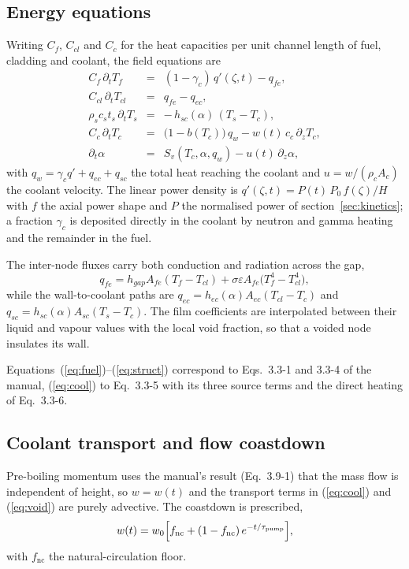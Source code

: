 \documentclass[11pt,a4paper]{article}
\begin{document}
\subsection{Energy equations}

Writing $C_f$, $C_{cl}$ and $C_c$ for the heat capacities per unit channel length of fuel,
cladding and coolant, the field equations are
\begin{eqnarray}
C_f\,\partial_t T_f &=& (1-\gamma_c)\,q'(\zeta,t) - q_{fe}, \label{eq:fuel}\\
C_{cl}\,\partial_t T_{cl} &=& q_{fe} - q_{ec}, \label{eq:clad}\\
\rho_s c_s t_s\,\partial_t T_s &=& -\,h_{sc}(\alpha)\,(T_s - T_c), \label{eq:struct}\\
C_c\,\partial_t T_c &=& \bigl(1 - b(T_c)\bigr)\,q_w - w(t)\,c_c\,\partial_z T_c,
  \label{eq:cool}\\
\partial_t \alpha &=& S_v(T_c,\alpha,q_w) - u(t)\,\partial_z \alpha, \label{eq:void}
\end{eqnarray}
with $q_w = \gamma_c q' + q_{ec} + q_{sc}$ the total heat reaching the coolant and
$u = w/(\rho_c A_c)$ the coolant velocity. The linear power density is
$q'(\zeta,t) = P(t)\,P_0\,f(\zeta)/H$ with $f$ the axial power shape and $P$ the normalised
power of section~\ref{sec:kinetics}; a fraction $\gamma_c$ is deposited directly in the
coolant by neutron and gamma heating and the remainder in the fuel.

The inter-node fluxes carry both conduction and radiation across the gap,
\begin{equation}
q_{fe} = h_{gap} A_{fe} (T_f - T_{cl})
       + \sigma \varepsilon A_{fe} \bigl(T_f^4 - T_{cl}^4\bigr),
\end{equation}
while the wall-to-coolant paths are
$q_{ec} = h_{ec}(\alpha) A_{ec} (T_{cl} - T_c)$ and
$q_{sc} = h_{sc}(\alpha) A_{sc} (T_s - T_c)$. The film coefficients are interpolated
between their liquid and vapour values with the local void fraction, so that a voided node
insulates its wall.

Equations~(\ref{eq:fuel})--(\ref{eq:struct}) correspond to Eqs.~3.3-1 and 3.3-4 of the
manual, (\ref{eq:cool}) to Eq.~3.3-5 with its three source terms and the direct heating of
Eq.~3.3-6.

\subsection{Coolant transport and flow coastdown}

Pre-boiling momentum uses the manual's result (Eq.~3.9-1) that the mass flow is independent
of height, so $w = w(t)$ and the transport terms in (\ref{eq:cool}) and (\ref{eq:void}) are
purely advective. The coastdown is prescribed,
\begin{equation}
w(t) = w_0 \Bigl[ f_{\mathrm{nc}} + (1 - f_{\mathrm{nc}})\,
       e^{-t/\tau_{\mathrm{pump}}} \Bigr],
\end{equation}
with $f_{\mathrm{nc}}$ the natural-circulation floor.
\end{document}
